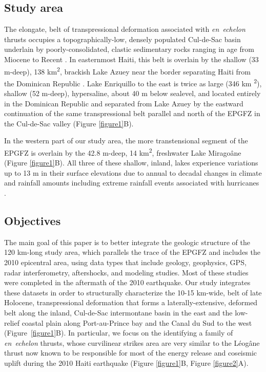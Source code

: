 \documentclass[linenumbers,draft]{agujournal}
\begin{document}
\subsection{Study area}
The elongate, belt of transpressional deformation associated with \textit{en~echelon} thrusts occupies a topographically-low, densely populated Cul-de-Sac basin underlain by poorly-consolidated, clastic sedimentary rocks ranging in age from Miocene to Recent \citep{massoni1955haiti,mann1995actively,terrier2014revision,saint2015seismotectonics}. In easternmost Haiti, this belt is overlain by the shallow (33 m-deep), 138 km\textsuperscript{2}, brackish Lake Azuey near the border separating Haiti from the Dominican Republic \citep{wright2015factors,piasecki2016bathymetric}. Lake Enriquillo to the east is twice as large (346 km \textsuperscript{2}), shallow (52 m-deep), hypersaline, about 40 m below sealevel, and located entirely in the Dominican Republic and separated from Lake Azuey by the eastward continuation of the same transpressional belt parallel and north of the EPGFZ in the Cul-de-Sac valley \citep{mann1995actively} (Figure \ref{figure1}B). 

In the western part of our study area, the more transtensional segment of the EPGFZ is overlain by the 42.8 m-deep, 14 km\textsuperscript{2}, freshwater Lake Mirago\^ane (Figure \ref{figure1}B). All three of these shallow, inland, lakes experience variations up to 13 m in their surface elevations due to annual to decadal changes in climate and rainfall amounts including extreme rainfall events associated with hurricanes \citep{wright2015factors,piasecki2016bathymetric,moknatian2017development,rico2017hydrodynamic}.  

\subsection{Objectives}
The main goal of this paper is to better integrate the geologic structure of the 120 km-long study area, which parallels the trace of the EPGFZ and includes the 2010 epicentral area, using data types that include geology, geophysics, GPS, radar interferometry, aftershocks, and modeling studies. Most of these studies were completed in the aftermath of the 2010 earthquake. Our study integrates these datasets in order to structurally characterize the 10-15 km-wide, belt of late Holocene, transpressional deformation that forms a laterally-extensive, deformed belt along the inland, Cul-de-Sac intermontane basin in the east and the low-relief coastal plain along Port-au-Prince bay and the Canal du Sud to the west (Figure~\ref{figure1}B). In particular, we focus on the identifying a family of \textit{en~echelon} thrusts, whose curvilinear strikes area are very similar to the L\'eog\^ane thrust now known to be responsible for most of the energy release and coseismic uplift during the 2010 Haiti earthquake \citep{calais2010transpressional,douilly2013crustal,douilly2015three} (Figure \ref{figure1}B, Figure \ref{figure2}A).
\end{document}
